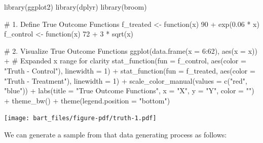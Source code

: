 \documentclass[
  letterpaper,
  DIV=11,
  numbers=noendperiod]{scrreprt}
\newenvironment{Shaded}{\begin{snugshade}}{\end{snugshade}}
\newcommand{\AttributeTok}[1]{\textcolor[rgb]{0.40,0.45,0.13}{#1}}
\newcommand{\CommentTok}[1]{\textcolor[rgb]{0.37,0.37,0.37}{#1}}
\newcommand{\ControlFlowTok}[1]{\textcolor[rgb]{0.00,0.23,0.31}{#1}}
\newcommand{\DecValTok}[1]{\textcolor[rgb]{0.68,0.00,0.00}{#1}}
\newcommand{\FloatTok}[1]{\textcolor[rgb]{0.68,0.00,0.00}{#1}}
\newcommand{\FunctionTok}[1]{\textcolor[rgb]{0.28,0.35,0.67}{#1}}
\newcommand{\NormalTok}[1]{\textcolor[rgb]{0.00,0.23,0.31}{#1}}
\newcommand{\OtherTok}[1]{\textcolor[rgb]{0.00,0.23,0.31}{#1}}
\newcommand{\SpecialCharTok}[1]{\textcolor[rgb]{0.37,0.37,0.37}{#1}}
\newcommand{\StringTok}[1]{\textcolor[rgb]{0.13,0.47,0.30}{#1}}
\begin{document}
\begin{Shaded}
\begin{Highlighting}[]
\FunctionTok{library}\NormalTok{(ggplot2)}
\FunctionTok{library}\NormalTok{(dplyr)}
\FunctionTok{library}\NormalTok{(broom) }

\CommentTok{\# 1. Define True Outcome Functions}
\NormalTok{f\_treated }\OtherTok{\textless{}{-}} \ControlFlowTok{function}\NormalTok{(x) }\DecValTok{90} \SpecialCharTok{+} \FunctionTok{exp}\NormalTok{(}\FloatTok{0.06} \SpecialCharTok{*}\NormalTok{ x)}
\NormalTok{f\_control }\OtherTok{\textless{}{-}} \ControlFlowTok{function}\NormalTok{(x) }\DecValTok{72} \SpecialCharTok{+} \DecValTok{3} \SpecialCharTok{*} \FunctionTok{sqrt}\NormalTok{(x)}

\CommentTok{\# 2. Visualize True Outcome Functions}
\FunctionTok{ggplot}\NormalTok{(}\FunctionTok{data.frame}\NormalTok{(}\AttributeTok{x =} \DecValTok{6}\SpecialCharTok{:}\DecValTok{62}\NormalTok{), }\FunctionTok{aes}\NormalTok{(}\AttributeTok{x =}\NormalTok{ x)) }\SpecialCharTok{+}  \CommentTok{\# Expanded x range for clarity}
  \FunctionTok{stat\_function}\NormalTok{(}\AttributeTok{fun =}\NormalTok{ f\_control, }\FunctionTok{aes}\NormalTok{(}\AttributeTok{color =} \StringTok{"Truth {-} Control"}\NormalTok{), }\AttributeTok{linewidth =} \DecValTok{1}\NormalTok{) }\SpecialCharTok{+}  
  \FunctionTok{stat\_function}\NormalTok{(}\AttributeTok{fun =}\NormalTok{ f\_treated, }\FunctionTok{aes}\NormalTok{(}\AttributeTok{color =} \StringTok{"Truth {-} Treatment"}\NormalTok{), }\AttributeTok{linewidth =} \DecValTok{1}\NormalTok{) }\SpecialCharTok{+}
  \FunctionTok{scale\_color\_manual}\NormalTok{(}\AttributeTok{values =} \FunctionTok{c}\NormalTok{(}\StringTok{"red"}\NormalTok{, }\StringTok{"blue"}\NormalTok{)) }\SpecialCharTok{+}
  \FunctionTok{labs}\NormalTok{(}\AttributeTok{title =} \StringTok{"True Outcome Functions"}\NormalTok{, }\AttributeTok{x =} \StringTok{"X"}\NormalTok{, }\AttributeTok{y =} \StringTok{"Y"}\NormalTok{, }\AttributeTok{color =} \StringTok{""}\NormalTok{) }\SpecialCharTok{+}
  \FunctionTok{theme\_bw}\NormalTok{() }\SpecialCharTok{+}   
  \FunctionTok{theme}\NormalTok{(}\AttributeTok{legend.position =} \StringTok{"bottom"}\NormalTok{)  }
\end{Highlighting}
\end{Shaded}

\texttt{[image: bart\_files/figure-pdf/truth-1.pdf]}

We can generate a sample from that data generating process as follows:
\end{document}
